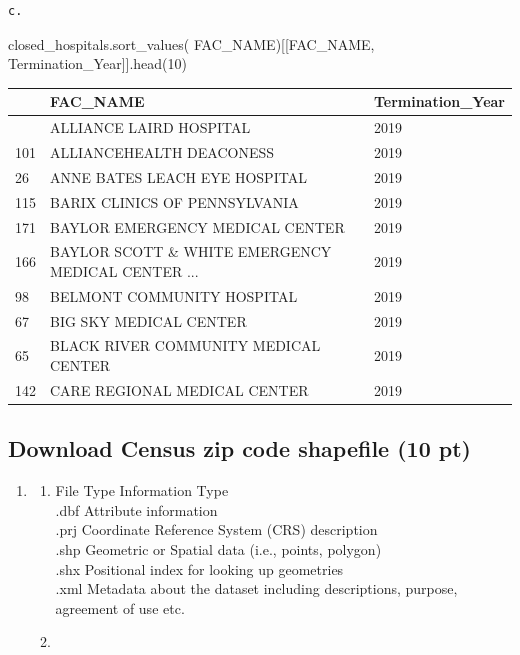 \documentclass[
  letterpaper,
  DIV=11,
  numbers=noendperiod]{scrartcl}
\newenvironment{Shaded}{\begin{snugshade}}{\end{snugshade}}
\newcommand{\DecValTok}[1]{\textcolor[rgb]{0.68,0.00,0.00}{#1}}
\newcommand{\NormalTok}[1]{\textcolor[rgb]{0.00,0.23,0.31}{#1}}
\newcommand{\StringTok}[1]{\textcolor[rgb]{0.13,0.47,0.30}{#1}}
\begin{document}
\begin{verbatim}
c. 
\end{verbatim}

\begin{Shaded}
\begin{Highlighting}[]
\NormalTok{closed\_hospitals.sort\_values(}
    \StringTok{\textquotesingle{}FAC\_NAME\textquotesingle{}}\NormalTok{)[[}\StringTok{\textquotesingle{}FAC\_NAME\textquotesingle{}}\NormalTok{, }\StringTok{\textquotesingle{}Termination\_Year\textquotesingle{}}\NormalTok{]].head(}\DecValTok{10}\NormalTok{)}
\end{Highlighting}
\end{Shaded}

\begin{longtable}[]{@{}lll@{}}
\toprule\noalign{}
& FAC\_NAME & Termination\_Year \\
\midrule\noalign{}
\endhead
\bottomrule\noalign{}
\endlastfoot
62 & ALLIANCE LAIRD HOSPITAL & 2019 \\
101 & ALLIANCEHEALTH DEACONESS & 2019 \\
26 & ANNE BATES LEACH EYE HOSPITAL & 2019 \\
115 & BARIX CLINICS OF PENNSYLVANIA & 2019 \\
171 & BAYLOR EMERGENCY MEDICAL CENTER & 2019 \\
166 & BAYLOR SCOTT \& WHITE EMERGENCY MEDICAL CENTER ... & 2019 \\
98 & BELMONT COMMUNITY HOSPITAL & 2019 \\
67 & BIG SKY MEDICAL CENTER & 2019 \\
65 & BLACK RIVER COMMUNITY MEDICAL CENTER & 2019 \\
142 & CARE REGIONAL MEDICAL CENTER & 2019 \\
\end{longtable}

\subsection{Download Census zip code shapefile (10
pt)}\label{download-census-zip-code-shapefile-10-pt}

\begin{enumerate}
\def\labelenumi{\arabic{enumi}.}
\item
  \begin{enumerate}
  \def\labelenumii{\alph{enumii}.}
  \item
    File Type \textbar{} Information Type \textbar{}\\
    .dbf\textbar{} Attribute information \textbar{}\\
    .prj \textbar{} Coordinate Reference System (CRS) description
    \textbar{}\\
    .shp \textbar{} Geometric or Spatial data (i.e., points, polygon)
    \textbar{}\\
    .shx \textbar{} Positional index for looking up geometries
    \textbar{}\\
    .xml \textbar{} Metadata about the dataset including descriptions,
    purpose, agreement of use etc. \textbar{}
  \item
  \end{enumerate}
\end{enumerate}
\end{document}
